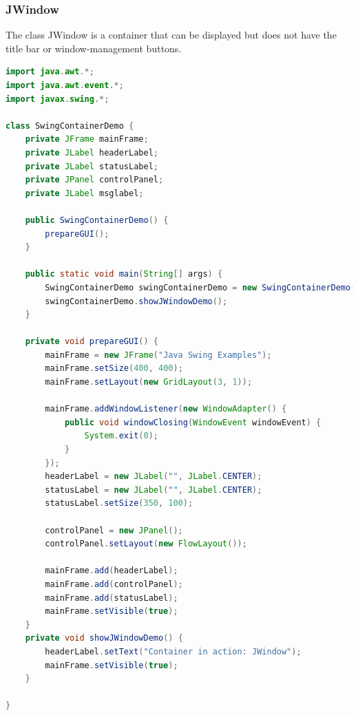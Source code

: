 \documentclass[11pt]{article}
\begin{document}
\subsubsection{JWindow}
The class JWindow is a container that can be displayed but does not have the title bar or window-management buttons.
\begin{lstlisting}[language=Java]
import java.awt.*;
import java.awt.event.*;
import javax.swing.*;

class SwingContainerDemo {
    private JFrame mainFrame;
    private JLabel headerLabel;
    private JLabel statusLabel;
    private JPanel controlPanel;
    private JLabel msglabel;

    public SwingContainerDemo() {
        prepareGUI();
    }

    public static void main(String[] args) {
        SwingContainerDemo swingContainerDemo = new SwingContainerDemo();
        swingContainerDemo.showJWindowDemo();
    }

    private void prepareGUI() {
        mainFrame = new JFrame("Java Swing Examples");
        mainFrame.setSize(400, 400);
        mainFrame.setLayout(new GridLayout(3, 1));

        mainFrame.addWindowListener(new WindowAdapter() {
            public void windowClosing(WindowEvent windowEvent) {
                System.exit(0);
            }
        });
        headerLabel = new JLabel("", JLabel.CENTER);
        statusLabel = new JLabel("", JLabel.CENTER);
        statusLabel.setSize(350, 100);

        controlPanel = new JPanel();
        controlPanel.setLayout(new FlowLayout());

        mainFrame.add(headerLabel);
        mainFrame.add(controlPanel);
        mainFrame.add(statusLabel);
        mainFrame.setVisible(true);
    }
    private void showJWindowDemo() {
        headerLabel.setText("Container in action: JWindow");
        mainFrame.setVisible(true);
    }

}
\end{lstlisting}
\end{document}
